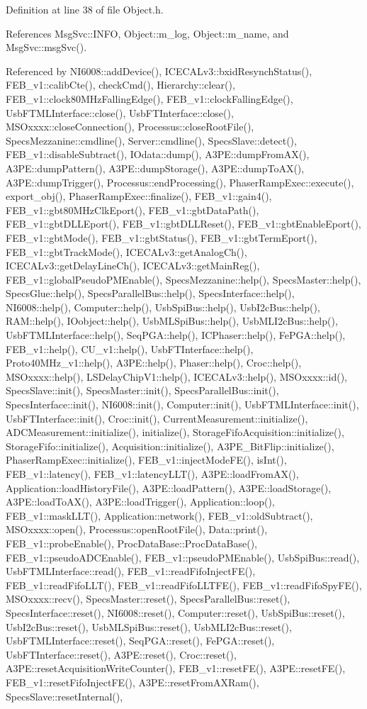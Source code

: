 Definition at line 38 of file Object.h.

References MsgSvc::INFO, Object::m\_\-log, Object::m\_\-name, and MsgSvc::msgSvc().

Referenced by NI6008::addDevice(), ICECALv3::bxidResynchStatus(), FEB\_\-v1::calibCte(), checkCmd(), Hierarchy::clear(), FEB\_\-v1::clock80MHzFallingEdge(), FEB\_\-v1::clockFallingEdge(), UsbFTMLInterface::close(), UsbFTInterface::close(), MSOxxxx::closeConnection(), Processus::closeRootFile(), SpecsMezzanine::cmdline(), Server::cmdline(), SpecsSlave::detect(), FEB\_\-v1::disableSubtract(), IOdata::dump(), A3PE::dumpFromAX(), A3PE::dumpPattern(), A3PE::dumpStorage(), A3PE::dumpToAX(), A3PE::dumpTrigger(), Processus::endProcessing(), PhaserRampExec::execute(), export\_\-obj(), PhaserRampExec::finalize(), FEB\_\-v1::gain4(), FEB\_\-v1::gbt80MHzClkEport(), FEB\_\-v1::gbtDataPath(), FEB\_\-v1::gbtDLLEport(), FEB\_\-v1::gbtDLLReset(), FEB\_\-v1::gbtEnableEport(), FEB\_\-v1::gbtMode(), FEB\_\-v1::gbtStatus(), FEB\_\-v1::gbtTermEport(), FEB\_\-v1::gbtTrackMode(), ICECALv3::getAnalogCh(), ICECALv3::getDelayLineCh(), ICECALv3::getMainReg(), FEB\_\-v1::globalPseudoPMEnable(), SpecsMezzanine::help(), SpecsMaster::help(), SpecsGlue::help(), SpecsParallelBus::help(), SpecsInterface::help(), NI6008::help(), Computer::help(), UsbSpiBus::help(), UsbI2cBus::help(), RAM::help(), IOobject::help(), UsbMLSpiBus::help(), UsbMLI2cBus::help(), UsbFTMLInterface::help(), SeqPGA::help(), ICPhaser::help(), FePGA::help(), FEB\_\-v1::help(), CU\_\-v1::help(), UsbFTInterface::help(), Proto40MHz\_\-v1::help(), A3PE::help(), Phaser::help(), Croc::help(), MSOxxxx::help(), LSDelayChipV1::help(), ICECALv3::help(), MSOxxxx::id(), SpecsSlave::init(), SpecsMaster::init(), SpecsParallelBus::init(), SpecsInterface::init(), NI6008::init(), Computer::init(), UsbFTMLInterface::init(), UsbFTInterface::init(), Croc::init(), CurrentMeasurement::initialize(), ADCMeasurement::initialize(), initialize(), StorageFifoAcquisition::initialize(), StorageFifo::initialize(), Acquisition::initialize(), A3PE\_\-BitFlip::initialize(), PhaserRampExec::initialize(), FEB\_\-v1::injectModeFE(), isInt(), FEB\_\-v1::latency(), FEB\_\-v1::latencyLLT(), A3PE::loadFromAX(), Application::loadHistoryFile(), A3PE::loadPattern(), A3PE::loadStorage(), A3PE::loadToAX(), A3PE::loadTrigger(), Application::loop(), FEB\_\-v1::maskLLT(), Application::network(), FEB\_\-v1::oldSubtract(), MSOxxxx::open(), Processus::openRootFile(), Data::print(), FEB\_\-v1::probeEnable(), ProcDataBase::ProcDataBase(), FEB\_\-v1::pseudoADCEnable(), FEB\_\-v1::pseudoPMEnable(), UsbSpiBus::read(), UsbFTMLInterface::read(), FEB\_\-v1::readFifoInjectFE(), FEB\_\-v1::readFifoLLT(), FEB\_\-v1::readFifoLLTFE(), FEB\_\-v1::readFifoSpyFE(), MSOxxxx::recv(), SpecsMaster::reset(), SpecsParallelBus::reset(), SpecsInterface::reset(), NI6008::reset(), Computer::reset(), UsbSpiBus::reset(), UsbI2cBus::reset(), UsbMLSpiBus::reset(), UsbMLI2cBus::reset(), UsbFTMLInterface::reset(), SeqPGA::reset(), FePGA::reset(), UsbFTInterface::reset(), A3PE::reset(), Croc::reset(), A3PE::resetAcquisitionWriteCounter(), FEB\_\-v1::resetFE(), A3PE::resetFE(), FEB\_\-v1::resetFifoInjectFE(), A3PE::resetFromAXRam(), SpecsSlave::resetInternal(), 